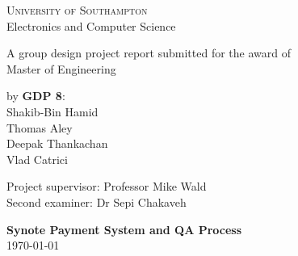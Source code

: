 \begin{titlepage}
    \begin{center}
        \vfill
        
        \large
        \textsc{University of Southampton}
        \\
        {Electronics and Computer Science}
        
        \vspace{3.0cm}
        
        \large
        {A group design project report submitted for the award of}\\
        {Master of Engineering}\\
        
        \vspace{3.0cm}
        
        by \textbf{GDP 8}:\\
        {Shakib-Bin Hamid}\\
        {Thomas Aley}\\
        {Deepak Thankachan}\\
        {Vlad Catrici}
        
        \vspace{3.0cm}
        
        \large
        Project supervisor: Professor Mike Wald\\
        Second examiner: Dr Sepi Chakaveh\\
        
        \vspace{3.0cm}
        
        \textbf{Synote Payment System and QA Process}\\
        \today
        
        \vfill
        
    \end{center}
\end{titlepage}